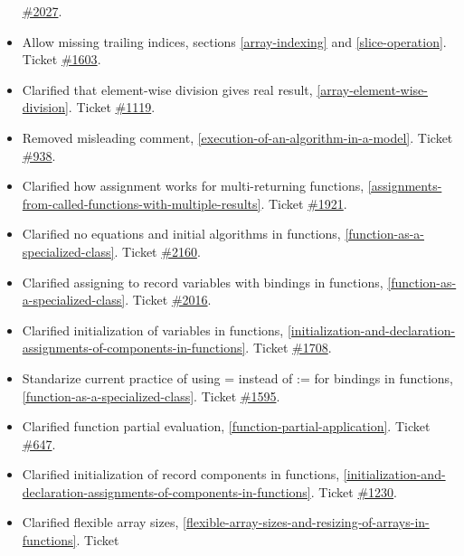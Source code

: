 \begin{itemize}
  \href{https://github.com/modelica/ModelicaSpecification/issues/2027}{\#2027}.
\item
  Allow missing trailing indices, sections \cref{array-indexing} and \cref{slice-operation}. Ticket
  \href{https://github.com/modelica/ModelicaSpecification/issues/1603}{\#1603}.
\item
  Clarified that element-wise division gives real result,
  \cref{array-element-wise-division}. Ticket
  \href{https://github.com/modelica/ModelicaSpecification/issues/1119}{\#1119}.
\item
  Removed misleading comment, \cref{execution-of-an-algorithm-in-a-model}. Ticket
  \href{https://github.com/modelica/ModelicaSpecification/issues/938}{\#938}.
\item
  Clarified how assignment works for multi-returning functions,
  \cref{assignments-from-called-functions-with-multiple-results}. Ticket
  \href{https://github.com/modelica/ModelicaSpecification/issues/1921}{\#1921}.
\item
  Clarified no equations and initial algorithms in functions,
  \cref{function-as-a-specialized-class}. Ticket
  \href{https://github.com/modelica/ModelicaSpecification/issues/2160}{\#2160}.
\item
  Clarified assigning to record variables with bindings in functions,
  \cref{function-as-a-specialized-class}. Ticket
  \href{https://github.com/modelica/ModelicaSpecification/issues/2016}{\#2016}.
\item
  Clarified initialization of variables in functions, \cref{initialization-and-declaration-assignments-of-components-in-functions}.
  Ticket \href{https://github.com/modelica/ModelicaSpecification/issues/1708}{\#1708}.
\item
  Standarize current practice of using = instead of := for bindings in
  functions, \cref{function-as-a-specialized-class}. Ticket
  \href{https://github.com/modelica/ModelicaSpecification/issues/1595}{\#1595}.
\item
  Clarified function partial evaluation, \cref{function-partial-application}. Ticket
  \href{https://github.com/modelica/ModelicaSpecification/issues/647}{\#647}.
\item
  Clarified initialization of record components in functions,
  \cref{initialization-and-declaration-assignments-of-components-in-functions}. Ticket
  \href{https://github.com/modelica/ModelicaSpecification/issues/1230}{\#1230}.
\item
  Clarified flexible array sizes, \cref{flexible-array-sizes-and-resizing-of-arrays-in-functions}. Ticket

\end{itemize}
